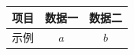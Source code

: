 \begin{tabular}{@{}lcc@{}}
\toprule
项目 & 数据一 & 数据二 \\
\midrule
示例 & $a$ & $b$ \\
\bottomrule
\end{tabular}
